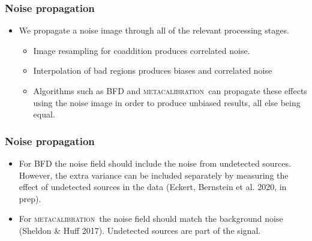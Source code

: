 \documentclass{beamer}
\newcommand{\mcal}{\textsc{metacalibration}}
\begin{document}
\frame
{

    \frametitle{Noise propagation}

    \begin{itemize}

        \item We propagate a noise image through all of the relevant processing
            stages.

        \begin{itemize}

            \item Image resampling for coaddition produces correlated noise.

            \item Interpolation of bad regions produces biases and correlated
                noise

            \item Algorithms such as BFD and \mcal\ can
                propagate these effects using the noise image in order to
                produce unbiased results, all else being equal.

        \end{itemize}


    \end{itemize}

}

\frame
{

    \frametitle{Noise propagation}

    \begin{itemize}

        \item For BFD the noise field should include the noise from undetected
            sources.  However, the extra variance can be included separately by
            measuring the effect of undetected sources in the data (Eckert, Bernstein et
            al. 2020, in prep).

        \item For \mcal\ the noise field should match the background noise (Sheldon \& Huff 2017).
            Undetected sources are part of the signal.
            

    \end{itemize}

}
\end{document}
